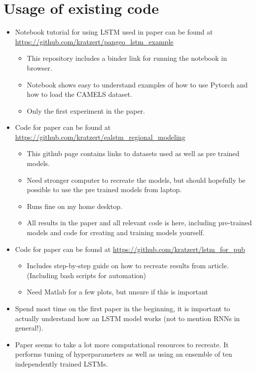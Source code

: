 \documentclass[a4paper,12pt,english]{article}
\begin{document}
\section*{Usage of existing code}
\begin{itemize}
\item Notebook tutorial for using LSTM used in paper \cite{lstm_first_paper} can be found at \url{https://github.com/kratzert/pangeo_lstm_example}
\begin{itemize}
\item This repository includes a binder link for running the notebook in browser.
\item Notebook shows easy to understand examples of how to use Pytorch and how to load the CAMELS dataset.
\item Only the first experiment in the paper.
\end{itemize}
\item Code for paper \cite{lstm_second_paper} can be found at \url{https://github.com/kratzert/ealstm_regional_modeling}
\begin{itemize}
\item This github page contains links to datasets used as well as pre trained models. 
\item Need stronger computer to recreate the models, but should hopefully be possible to use the pre trained models from laptop.
\item Runs fine on my home desktop.
\item All results in the paper and all relevant code is here, including pre-trained models and code for creating and training models yourself.
\end{itemize}
\item Code for paper \cite{lstm_third_paper} can be found at \url{https://github.com/kratzert/lstm_for_pub}
\begin{itemize}
\item Includes step-by-step guide on how to recreate results from article. (Including bash scripts for automation)
\item Need Matlab for a few plots, but unsure if this is important
\end{itemize}
\item Spend most time on the first paper in the beginning, it is important to actually understand how an LSTM model works (not to mention RNNs in general!).
\item Paper \cite{lstm_third_paper} seems to take a lot more computational resources to recreate. It performs tuning of hyperparameters as well as using an ensemble of ten independently trained LSTMs.
\end{itemize}
\end{document}
